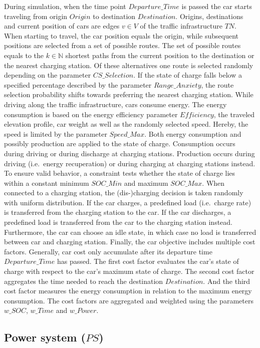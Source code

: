 During simulation, when the time point $Departure\_Time$ is passed the car starts traveling from origin $Origin$ to destination $Destination$. Origins, destinations and current position of cars are edges $v \in V$ of the traffic infrastructure $TN$. When starting to travel, the car position equals the origin, while subsequent positions are selected from a set of possible routes. The set of possible routes equals to the $k \in \mathbb{N}$ shortest paths from the current position to the destination or the nearest charging station. Of these alternatives one route is selected randomly depending on the parameter $CS\_Selection$. If the state of charge falls below a specified percentage described by the parameter $Range\_Anxiety$, the route selection probability shifts towards preferring the nearest charging station. While driving along the traffic infrastructure, cars consume energy. The energy consumption is based on the energy efficiency parameter $Efficiency$, the traveled elevation profile, car weight as well as the randomly selected speed. Hereby, the speed is limited by the parameter $Speed\_Max$. Both energy consumption and possibly production are applied to the state of charge. Consumption occurs during driving or during discharge at charging stations. Production occurs during driving (i.e.\ energy recuperation) or during charging at charging stations instead. To ensure valid behavior, a constraint tests whether the state of charge lies within a constant minimum $SOC\_Min$ and maximum $SOC\_Max$. When connected to a charging station, the (dis-)charging decision is taken randomly with uniform distribution. If the car charges, a predefined load (i.e.\ charge rate) is transferred from the charging station to the car. If the car discharges, a predefined load is transferred from the car to the charging station instead. Furthermore, the car can choose an idle state, in which case no load is transferred between car and charging station. Finally, the car objective includes multiple cost factors. Generally, car cost only accumulate after its departure time $Departure\_Time$ has passed. The first cost factor evaluates the car's state of charge with respect to the car's maximum state of charge. The second cost factor aggregates the time needed to reach the destination $Destination$. And the third cost factor measures the energy consumption in relation to the maximum energy consumption. The cost factors are aggregated and weighted using the parameters $w\_SOC$, $w\_Time$ and $w\_Power$.

\subsection{Power system ($PS$)}

